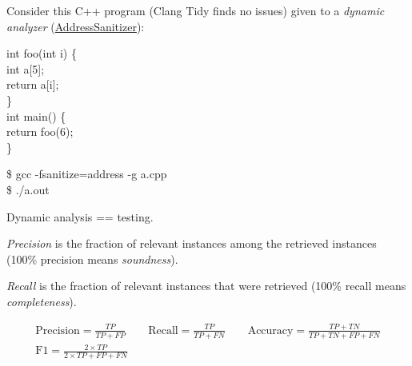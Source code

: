 \documentclass{article}
\begin{document}
\plush{}


Consider this C++ program (Clang Tidy finds no issues) given to a \emph{dynamic analyzer}
(\href{https://en.wikipedia.org/wiki/Code_sanitizer}{AddressSanitizer}):

\begin{pptWideOne}
\begin{multicols}{2}
{\ttfamily
int foo(int i) \{ \\
\quad int a[5]; \\
\quad return a[i]; \\
\} \\
int main() \{ \\
\quad return foo(6); \\
\}}
\par\columnbreak\par
{\ttfamily
\$ gcc -fsanitize=address -g a.cpp \\
\$ ./a.out}

\end{multicols}
\end{pptWideOne}

Dynamic analysis == testing.

\plush{}




\plush{}


\emph{Precision} is the fraction of relevant instances among the retrieved instances (100\% precision means \emph{soundness}).

\emph{Recall} is the fraction of relevant instances that were retrieved (100\% recall means \emph{completeness}).

\begin{pptWideOne}
\begin{gather*}
\text{Precision} = \frac{TP}{TP + FP}
\quad\quad
\text{Recall} = \frac{TP}{TP + FN}
\quad\quad
\text{Accuracy} = \frac{TP + TN}{TP + TN + FP + FN}
\\[12pt]
\text{F1} = \frac{2 \times TP}{2 \times TP + FP + FN}
\\
\end{gather*}
\end{pptWideOne}
\end{document}
